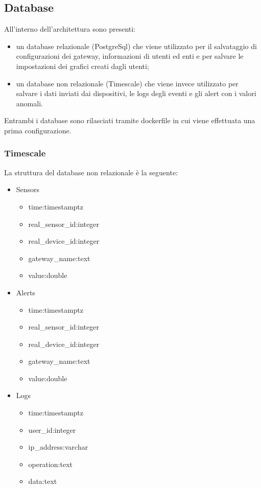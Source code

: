 \subsection{Database}
All'interno dell'architettura sono presenti:
\begin{itemize}
	\item un database relazionale (PostgreSql) che viene utilizzato per il salvataggio di configurazioni dei gateway, informazioni di utenti ed enti e per salvare le impostazioni dei grafici creati dagli utenti;
	\item un database non relazionale (Timescale) che viene invece utilizzato per salvare i dati inviati dai dispositivi, le logs degli eventi e gli alert con i valori anomali. 
\end{itemize}
Entrambi i database sono rilasciati tramite dockerfile in cui viene effettuata una prima configurazione.
\subsubsection{Timescale}
La struttura del database non relazionale è la seguente:
\begin{itemize}
	\item Sensors
	\begin{itemize}
		\item time:timestamptz
		\item real\_sensor\_id:integer
		\item real\_device\_id:integer
		\item gateway\_name:text
		\item value:double
	\end{itemize}
	\item Alerts
	\begin{itemize}
		\item time:timestamptz
		\item real\_sensor\_id:integer
		\item real\_device\_id:integer
		\item gateway\_name:text
		\item value:double
	\end{itemize}
	\item Logs
	\begin{itemize}
		\item time:timestamptz
		\item user\_id:integer
		\item ip\_address:varchar
		\item operation:text
		\item data:text
	\end{itemize}
\end{itemize}
